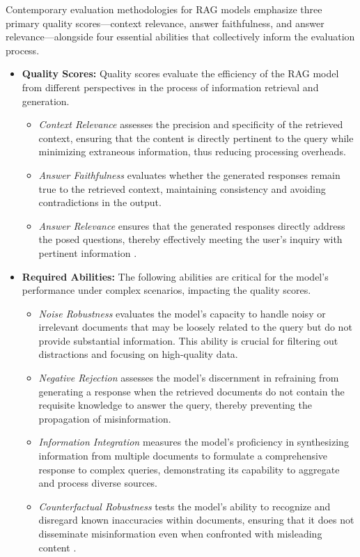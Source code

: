 Contemporary evaluation methodologies for RAG models emphasize three primary quality scores—context relevance, answer faithfulness, and answer relevance—alongside four essential abilities that collectively inform the evaluation process.

\begin{itemize}
    \item \textbf{Quality Scores:} Quality scores evaluate the efficiency of the RAG model from different perspectives in the process of information retrieval and generation. 
    \begin{itemize}
        \item \textit{Context Relevance} assesses the precision and specificity of the retrieved context, ensuring that the content is directly pertinent to the query while minimizing extraneous information, thus reducing processing overheads.
        \item \textit{Answer Faithfulness} evaluates whether the generated responses remain true to the retrieved context, maintaining consistency and avoiding contradictions in the output.
        \item \textit{Answer Relevance} ensures that the generated responses directly address the posed questions, thereby effectively meeting the user's inquiry with pertinent information \cite{es2023ragas, saad2023ares}.
    \end{itemize}

    \item \textbf{Required Abilities:} The following abilities are critical for the model’s performance under complex scenarios, impacting the quality scores.
    \begin{itemize}
        \item \textit{Noise Robustness} evaluates the model’s capacity to handle noisy or irrelevant documents that may be loosely related to the query but do not provide substantial information. This ability is crucial for filtering out distractions and focusing on high-quality data.
        \item \textit{Negative Rejection} assesses the model’s discernment in refraining from generating a response when the retrieved documents do not contain the requisite knowledge to answer the query, thereby preventing the propagation of misinformation.
        \item \textit{Information Integration} measures the model’s proficiency in synthesizing information from multiple documents to formulate a comprehensive response to complex queries, demonstrating its capability to aggregate and process diverse sources.
        \item \textit{Counterfactual Robustness} tests the model’s ability to recognize and disregard known inaccuracies within documents, ensuring that it does not disseminate misinformation even when confronted with misleading content \cite{chen2024benchmarking, liu2023recall}.
    \end{itemize}
\end{itemize}

